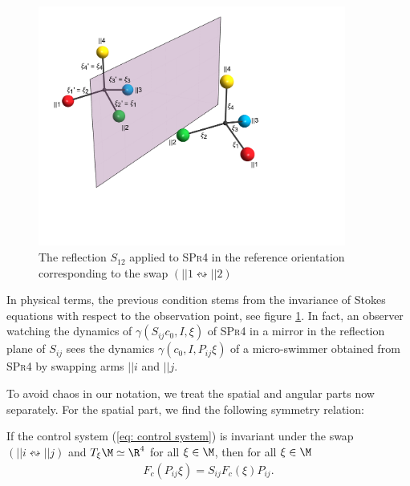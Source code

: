 \begin{figure}[h]
\centering
\includegraphics[width = 0.9\textwidth]{images/reflection.png}
\caption{The reflection $S_{12}$ applied to \textsc{SPr4} in the reference orientation corresponding to the swap $(||1 \leftrightsquigarrow ||2)$ }
\label{fig:reflection of swimmer}
\end{figure}

\begin{remark}
In physical terms, the previous condition stems from the invariance of Stokes equations with respect to the observation point, see figure \ref{fig:reflection of swimmer}. In fact, an observer watching the dynamics of $\gamma(S_{ij}c_0, I, \xi)$ of \textsc{SPr4} in a mirror in the reflection plane of $S_{ij}$ sees the dynamics $\gamma(c_0, I, P_{ij} \xi)$ of a micro-swimmer obtained from \textsc{SPr4} by swapping arms $||i$ and $||j$.
\end{remark}


To avoid chaos in our notation, we treat the spatial and angular parts now separately. For the spatial part, we find the following symmetry relation:

\begin{proposition}
\label{prop: spatial permutation invariance}
If the control system (\ref{eq: control system}) is invariant under the swap $(||i \leftrightsquigarrow ||j)$ and $T_{\xi} \M \simeq \R^4$ for all $\xi \in \M$, then for all $\xi \in \M$
\begin{align}
	 F_c(P_{ij} \xi) = S_{ij} F_c(\xi) P_{ij}.
\end{align}
\end{proposition}

